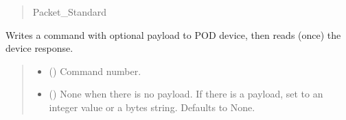 \documentclass[letterpaper,10pt,english]{sphinxmanual}
\begin{document}
\begin{fulllineitems}
\begin{fulllineitems}
\begin{quote}
\begin{description}
\sphinxAtStartPar
Packet\_Standard

\end{description}\end{quote}

\end{fulllineitems}


\begin{fulllineitems}
\label{\detokenize{PodApi.Devices:PodApi.Devices.BasicPodProtocol.Pod.WriteRead}}
\pysigstartsignatures
{}
\pysigstopsignatures
\sphinxAtStartPar
Writes a command with optional payload to POD device, then reads (once) the device response.
\begin{quote}\begin{description}
\begin{itemize}
\item {} 
\sphinxAtStartPar
{} (\sphinxstyleliteralemphasis{\sphinxupquote{ | }}) \textendash{} Command number.

\item {} 
\sphinxAtStartPar
{} (\sphinxstyleliteralemphasis{\sphinxupquote{ | }}\sphinxstyleliteralemphasis{\sphinxupquote{ | }}\sphinxstyleliteralemphasis{\sphinxupquote{{[}}}\sphinxstyleliteralemphasis{\sphinxupquote{|}}\sphinxstyleliteralemphasis{\sphinxupquote{{]}}}\sphinxstyleliteralemphasis{\sphinxupquote{, }}) \textendash{} None when there is no payload. If there                 is a payload, set to an integer value or a bytes string. Defaults to None.


\end{itemize}
\end{description}
\end{quote}
\end{fulllineitems}
\end{fulllineitems}
\end{document}
